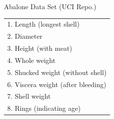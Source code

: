 \begin{frame}{Abalone Data Set (UCI Repo.)}
\begin{minipage}[t]{0.45\linewidth}
\begin{scriptsize}
\begin{tabular}{|l|}
\hline
1. Length (longest shell) \\
2. Diameter\\
3. Height (with meat)\\
4. Whole weight  \\
5. Shucked weight (without shell)\\
6. Viscera weight (after bleeding) \\
7. Shell weight \\
8. Rings (indicating age)\\
\hline
\end{tabular}
\end{scriptsize}
\end{minipage}
\end{frame}